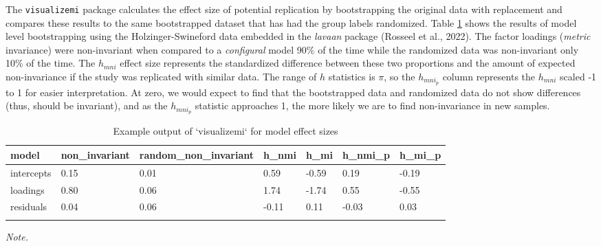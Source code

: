 \documentclass[
  english,
  man]{apa7}
\begin{document}
The \texttt{visualizemi} package calculates the effect size of potential replication by bootstrapping the original data with replacement and compares these results to the same bootstrapped dataset that has had the group labels randomized. Table \ref{tab:table-1-example} shows the results of model level bootstrapping using the Holzinger-Swineford data embedded in the \emph{lavaan} package (Rosseel et al., 2022). The factor loadings (\emph{metric} invariance) were non-invariant when compared to a \emph{configural} model 90\% of the time while the randomized data was non-invariant only 10\% of the time. The \(h_{mni}\) effect size represents the standardized difference between these two proportions and the amount of expected non-invariance if the study was replicated with similar data. The range of \(h\) statistics is \(\pi\), so the \(h_{mni_p}\) column represents the \(h_{mni}\) scaled -1 to 1 for easier interpretation. At zero, we would expect to find that the bootstrapped data and randomized data do not show differences (thus, should be invariant), and as the \(h_{mni_p}\) statistic approaches 1, the more likely we are to find non-invariance in new samples.

\begin{table}[tbp]

\begin{center}
\begin{threeparttable}

\caption{\label{tab:table-1-example}Example output of `visualizemi` for model effect sizes}

\begin{tabular}{lllllll}
\toprule
model & \multicolumn{1}{c}{non\_invariant} & \multicolumn{1}{c}{random\_non\_invariant} & \multicolumn{1}{c}{h\_nmi} & \multicolumn{1}{c}{h\_mi} & \multicolumn{1}{c}{h\_nmi\_p} & \multicolumn{1}{c}{h\_mi\_p}\\
\midrule
intercepts & 0.15 & 0.01 & 0.59 & -0.59 & 0.19 & -0.19\\
loadings & 0.80 & 0.06 & 1.74 & -1.74 & 0.55 & -0.55\\
residuals & 0.04 & 0.06 & -0.11 & 0.11 & -0.03 & 0.03\\
\bottomrule
\addlinespace
\end{tabular}

\begin{tablenotes}[para]
\normalsize{\textit{Note.} }
\end{tablenotes}

\end{threeparttable}
\end{center}

\end{table}
\end{document}
